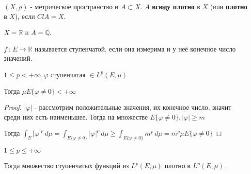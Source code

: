 \begin{definition}
    $(X, \rho)$ - метрическое пространство и $A \subset X$. $A$ \textbf{всюду плотно} в $X$ (или \textbf{плотно} в $X$), если $Cl A = X$.

    \begin{example}
        $X = \mathbb{R}$ и $A = \mathbb{Q}$.
    \end{example}
\end{definition}

\begin{definition}
    $f \, : \, E \to \mathbb{R}$ называется ступенчатой, если она измерима и у неё конечное число значений.
\end{definition}

\begin{lemma}
    $1 \leqslant p < +\infty, \varphi$ ступенчатая $\in L^p (E, \mu)$

    Тогда $\mu E \{ \varphi \neq 0 \} < +\infty$
\end{lemma}

\begin{proof}
    $|\varphi|$ - рассмотрим положительные значения, их конечное число, значит среди них есть наименьшее. Тогда
    на множестве $E \{ \varphi \neq 0 \}, |\varphi| \geqslant m$

    Тогда $\int_E |\varphi|^p \, d\mu = \int_{E \{ \varphi \neq 0 \}} |\varphi|^p \, d\mu \geqslant \int_{E \{ \varphi \neq 0 \}} m^p \, d\mu = m^p \mu E \{ \varphi \neq 0 \}$
\end{proof}

\begin{theorem}
    $1 \leqslant p \leqslant +\infty$

    Тогда множество ступенчатых функций из $L^p (E, \mu)$ плотно в $L^p (E, \mu)$.
\end{theorem}

